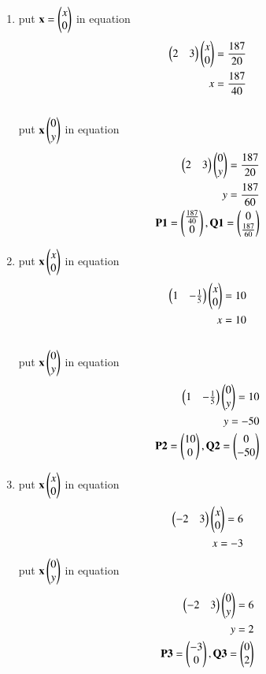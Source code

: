 \begin{enumerate}
\item put $\vec {x}  = \myvec{x\\0}$ in equation
\\ 
\begin{align}
\myvec{2 & 3}\myvec{x\\0} = \frac{187}{20}
\\
x= \frac{187}{40}
\end{align}
\\
put $\vec x \myvec{0\\y}$ in equation
\\
\begin{align}
\myvec{2 & 3}\myvec{0\\y} = \frac{187}{20}
\\
y= \frac{187}{60}
\\
\vec{P1} = \myvec{\frac{187}{40}\\0}, \vec{Q1} = \myvec{0\\\frac{187}{60}}
\end{align}



\item put $\vec x \myvec{x\\0}$ in equation 
\begin{align}
\myvec{1 & -\frac{1}{5}}\myvec{x\\0} = 10
\\
x= 10
\end{align}
\\
put $\vec x \myvec{0\\y}$ in equation
\\
\begin{align}
\myvec{1 & -\frac{1}{5}}\myvec{0\\y} = 10
\\
y= -50
\\
\vec{P2} = \myvec{10\\0}, \vec{Q2} = \myvec{0\\-50}
\end{align}


\item put $\vec x \myvec{x\\0}$ in equation 
\begin{align}
\myvec{-2 & 3}\myvec{x\\0} = 6
\\
x= -3
\end{align}
put $\vec x \myvec{0\\y}$ in equation
\\
\begin{align}
\myvec{-2 & 3}\myvec{0\\y} = 6
\\
y= 2
\\
\vec{P3} = \myvec{-3\\0}, \vec{Q3} = \myvec{0\\2}
\end{align}





\end{enumerate}
